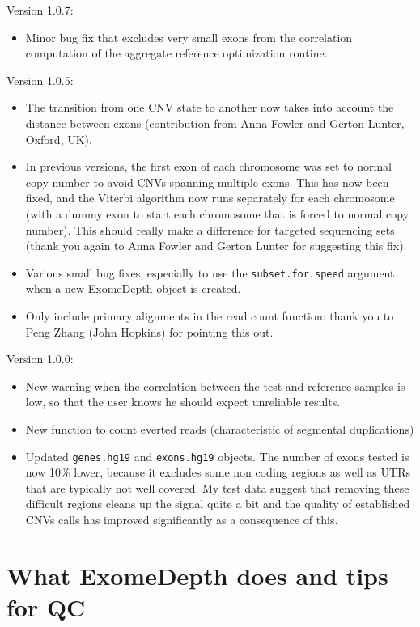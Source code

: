 \documentclass[10pt]{article}\usepackage[]{graphicx}\usepackage[]{color}
\begin{document}
Version 1.0.7:
\begin{itemize}
\item Minor bug fix that excludes very small exons from the correlation computation of the aggregate reference optimization routine.
\end{itemize}

Version 1.0.5:
\begin{itemize}
\item The transition from one CNV state to another now takes into account the distance between exons (contribution from Anna Fowler and Gerton Lunter, Oxford, UK).
\item In previous versions, the first exon of each chromosome was set to normal copy number to avoid CNVs spanning multiple exons. This has now been fixed, and the Viterbi algorithm now runs separately for each chromosome (with a dummy exon to start each chromosome that is forced to normal copy number). This should really make a difference for targeted sequencing sets (thank you again to Anna Fowler and Gerton Lunter for suggesting this fix).
\item Various small bug fixes, especially to use the \texttt{subset.for.speed} argument when a new ExomeDepth object is created.
\item Only include primary alignments in the read count function: thank you to Peng Zhang (John Hopkins) for pointing this out.
\end{itemize}


Version 1.0.0:
\begin{itemize}
\item New warning when the correlation between the test and reference samples is low, so that the user knows he should expect unreliable results.
\item New function to count everted reads (characteristic of segmental duplications)
\item Updated \texttt{genes.hg19} and \texttt{exons.hg19} objects. The number of exons tested is now 10\% lower, because it excludes some non coding regions as well as UTRs that are typically not well covered. My test data suggest that removing these difficult regions cleans up the signal quite a bit and the quality of established CNVs calls has improved significantly as a consequence of this. 
\end{itemize}



\section{What ExomeDepth does and tips for QC}
\end{document}
